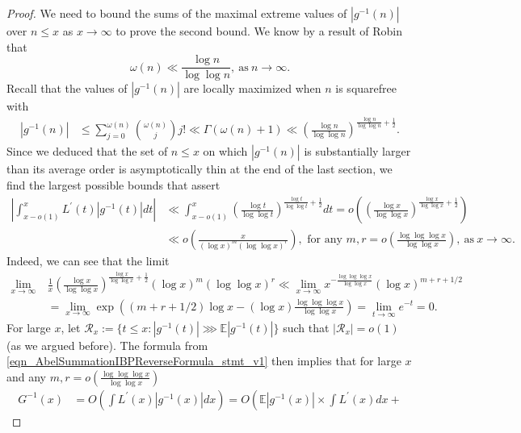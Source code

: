 \documentclass[11pt,reqno,a4letter]{article}
\numberwithin{figure}{section}
\numberwithin{table}{section}
\theoremstyle{plain}
\numberwithin{theorem}{section}
\theoremstyle{definition}
\begin{document}
\begin{proof}
We need to bound the sums of the maximal extreme values of $|g^{-1}(n)|$ over $n \leq x$
as $x \rightarrow \infty$ to prove the second bound. 
We know by a result of Robin that \cite{ROBIN-PRIMEOMEGAFUNC-BOUNDS}
\[
\omega(n) \ll \frac{\log n}{\log\log n}, \mathrm{\ as\ } n \rightarrow \infty. 
\]
Recall that the values of $|g^{-1}(n)|$ are locally maximized when $n$ is squarefree with 
\begin{align*}
|g^{-1}(n)| & \leq \sum_{j=0}^{\omega(n)} \binom{\omega(n)}{j} j! 
     \ll \Gamma(\omega(n)+1) 
     \ll \left(\frac{\log n}{\log\log n}\right)^{\frac{\log n}{\log\log n} + \frac{1}{2}}. 
\end{align*}
Since we deduced that the set of $n \leq x$ on which $|g^{-1}(n)|$ is substantially larger 
than its average order is asymptotically thin at the end of the last section, 
we find the largest possible bounds that assert 
\begin{align*}
     \left\lvert \int_{x-o(1)}^{x} L^{\prime}(t) |g^{-1}(t)| dt\right\vert & \ll 
\int_{x-o(1)}^{x} \left(\frac{\log t}{\log\log t}\right)^{\frac{\log t}{\log\log t} + 
     \frac{1}{2}} dt 
     = o\left(\left(\frac{\log x}{\log\log x}\right)^{\frac{\log x}{\log\log x} + \frac{1}{2}}\right) \\ 
     & \ll o\left(\frac{x}{(\log x)^m (\log\log x)^r}\right), \text{\ for\ any\ } 
     m, r = o\left(\frac{\log\log\log x}{\log\log x}\right), 
     \mathrm{\ as\ } x \rightarrow \infty. 
\end{align*}
Indeed, we can see that the limit 
\begin{align*}
     \lim_{x \rightarrow \infty}\ & \frac{1}{x} \left(\frac{\log x}{\log\log x} 
     \right)^{\frac{\log x}{\log\log x} + \frac{1}{2}} (\log x)^m (\log\log x)^r \ll 
\lim_{x \rightarrow \infty} x^{-\frac{\log\log\log x}{\log\log x}} 
     (\log x)^{m+r+1/2} \\ 
     & = \lim_{x \rightarrow \infty} \exp\left((m+r+1/2) \log x - (\log x) 
     \frac{\log\log\log x}{\log\log x}\right) 
     = \lim_{t \rightarrow \infty} e^{-t} = 0. 
\end{align*} 
For large $x$, let $\mathcal{R}_x := \{t \leq x: |g^{-1}(t)| \ggg \mathbb{E}|g^{-1}(t)|\}$ such that 
$|\mathcal{R}_x| = o(1)$ (as we argued before). 
The formula from \eqref{eqn_AbelSummationIBPReverseFormula_stmt_v1} then implies 
that for large $x$ and any $m, r = o\left(\frac{\log\log\log x}{\log\log x}\right)$ 
\begin{align*}
G^{-1}(x) & = O\left(\int L^{\prime}(x) |g^{-1}(x)| dx\right) 
     = O\left(\mathbb{E}|g^{-1}(x)| \times \int L^{\prime}(x) dx + 

\end{align*}
\end{proof}
\end{document}
